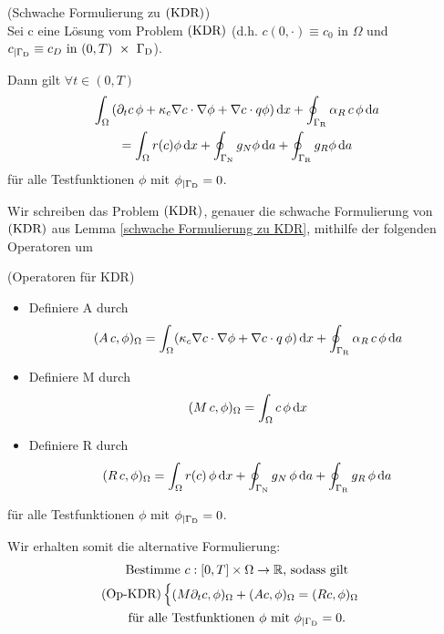 \begin{Lemma} \label{schwache Formulierung zu KDR}
	(Schwache Formulierung zu $ \operatorname{(KDR)} $)\\
	Sei c eine Lösung vom Problem $ \operatorname{(KDR)} $ (d.h. $ c(0,\cdot) \equiv c_0 \text{ in } \Omega $ und $ c_{|\Gamma_{\text{D}}} \equiv c_D \text{ in } (0,T)~\times~\Gamma_{\text{D}} $).
	
	Dann gilt $ \forall t \in (0,T) $
	\begin{gather*}
		\int_\Omega \left( \partial_t c \, \phi + \kappa_c \nabla c \cdot \nabla \phi + \nabla c \cdot q \phi \right) \mathop{}\!\mathrm{d} x + \oint_{\Gamma_{\text{R}}} \alpha_R \, c \, \phi \mathop{}\!\mathrm{d} a\\ = \int_\Omega r(c) \phi \mathop{}\!\mathrm{d} x + \oint_{\Gamma_{\text{N}}} g_N \phi \mathop{}\!\mathrm{d} a + \oint_{\Gamma_{\text{R}}} g_R \phi \mathop{}\!\mathrm{d} a
	\end{gather*}
	für alle Testfunktionen $ \phi $  mit $ \phi_{|\Gamma_{\text{D}}} = 0 $.
\end{Lemma}

Wir schreiben das Problem $ \operatorname{(KDR)} $, genauer die schwache Formulierung von $ \operatorname{(KDR)} $ aus Lemma \ref{schwache Formulierung zu KDR}, mithilfe der folgenden Operatoren um
\begin{define}(Operatoren für KDR)
	\begin{itemize}
		\item Definiere A durch
		\[ (A\, c , \phi)_\Omega = \int_\Omega (\kappa_c \nabla c \cdot \nabla \phi + \nabla c \cdot q \, \phi ) \mathop{}\!\mathrm{d} x + \oint_{\Gamma_{\text{R}}} \alpha_R \, c \, \phi \mathop{}\!\mathrm{d} a  \]
		\item Definiere M durch
		\[ (M \, c, \phi)_\Omega = \int_\Omega c \, \phi \mathop{}\!\mathrm{d} x \]
		\item Definiere R durch
		\[ (R\, c, \phi)_\Omega = \int_\Omega r(c) \, \phi \mathop{}\!\mathrm{d} x + \oint_{\Gamma_{\text{N}}} g_N \, \phi \mathop{}\!\mathrm{d} a + \oint_{\Gamma_{\text{R}}} g_R \, \phi \mathop{}\!\mathrm{d} a \]
	\end{itemize}
	für alle Testfunktionen $ \phi $ mit $ \phi_{|\Gamma_{\text{D}}} = 0 $.
\end{define}

Wir erhalten somit die alternative Formulierung:
\begin{gather*}
	\text{Bestimme } c:[0,T] \times \Omega \to \mathbb{R} \text{, sodass gilt}\\
	\operatorname{(Op-KDR)}\begin{cases}
		(M \partial_t c, \phi)_\Omega + (A c, \phi)_\Omega = (R c, \phi)_\Omega 
	\end{cases}\\
	\text{für alle Testfunktionen } \phi \text{ mit } \phi_{|\Gamma_{\text{D}}} = 0.
\end{gather*}

